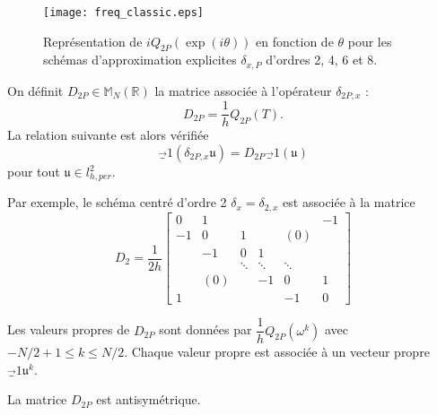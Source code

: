 \begin{figure}[htbp]
\begin{center}
\texttt{[image: freq\_classic.eps]}
\end{center}
\caption{Représentation de $i Q_{2P}\left( \exp(i \theta) \right)$ en fonction de $\theta$ pour les schémas d'approximation explicites $\delta_{x,P}$ d'ordres 2, 4, 6 et 8.}
\label{fig:freq_classic}
\end{figure}

On définit $D_{2P} \in \mathbb{M}_N(\mathbb{R})$ la matrice associée à l'opérateur $\delta_{2P,x}$ :
\begin{equation}
D_{2P} = \dfrac{1}{h} Q_{2P}(T).
\end{equation}
La relation suivante est alors vérifiée
\begin{equation}
\vec_1(\delta_{2P,x} \mathfrak{u}) = D_{2P} \vec_1 ( \mathfrak{u} )
\end{equation}
pour tout $\mathfrak{u} \in l^2_{h,per}$.

Par exemple, le schéma centré d'ordre 2 $\delta_x = \delta_{2,x}$ est associée à la matrice
\begin{equation}
D_2 = \dfrac{1}{2h}
\begin{bmatrix}
0 & 1 &   &   &   & -1 \\ 
-1 & 0 & 1 &   & (0) &   \\ 
  & -1 & 0 & 1 &   &   \\ 
  &   & \ddots & \ddots & \ddots &   \\ 
  & (0) &   & -1 & 0 & 1 \\ 
1 &   &   &   & -1 & 0
\end{bmatrix} 
\end{equation}

\begin{proposition}
Les valeurs propres de $D_{2P}$ sont données par $\dfrac{1}{h}Q_{2P}(\omega^k)$ avec $-N/2 +1 \leq k \leq N/2$. Chaque valeur propre est associée à un vecteur propre $\vec_1{\mathfrak{u}^k}$.
\end{proposition}

\begin{proposition}
La matrice $D_{2P}$ est antisymétrique.
\end{proposition}

